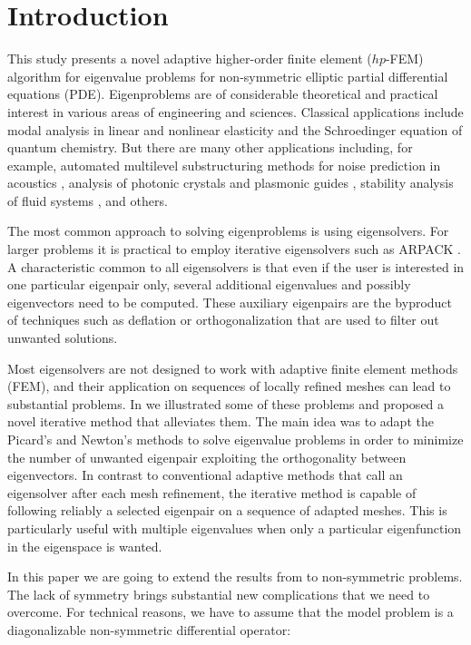 \documentclass[smallextended]{svjour3}
\begin{document}
\section{Introduction}\label{sec:intro}
\setcounter{equation}{0}

This study presents a novel adaptive higher-order finite element ($hp$-FEM) 
algorithm for eigenvalue problems for non-symmetric elliptic 
partial differential equations (PDE). Eigenproblems are of considerable 
theoretical and practical interest in various areas of engineering and 
sciences. Classical applications include modal analysis in linear and nonlinear
elasticity and the Schroedinger equation of quantum chemistry. But there
are many other applications including, for example, automated multilevel substructuring 
methods for noise prediction in acoustics \cite{lalor_prediction_2007},
analysis of photonic crystals \cite{pcf_apost,JoMeWi:95} and 
plasmonic guides \cite{berini_plasmon-polariton_2000},
stability analysis of fluid systems \cite{cliffe_adaptive_2010}, and others.

The most common approach to solving eigenproblems is using eigensolvers. For larger problems it is 
practical to employ iterative eigensolvers such as ARPACK \cite{arpack}. A characteristic common to 
all eigensolvers is that even if the user is interested in one particular eigenpair only, several 
additional eigenvalues and possibly eigenvectors need to be computed. These auxiliary eigenpairs are 
the byproduct of techniques such as deflation or orthogonalization that are used to filter out 
unwanted solutions.

Most eigensolvers are not designed to work with adaptive finite element methods (FEM), and 
their application on sequences of locally refined meshes can lead to substantial problems. 
In \cite{solin-giani} we illustrated some of these problems and proposed a novel iterative 
method that alleviates them. The main idea was to adapt the Picard's and Newton's methods 
to solve eigenvalue problems in order to minimize the number of unwanted eigenpair exploiting 
the orthogonality between eigenvectors. In contrast to conventional adaptive methods that 
call an eigensolver after each mesh refinement, the iterative method is capable of following 
reliably a selected eigenpair on a sequence of adapted meshes. This is particularly useful 
with multiple eigenvalues when only a particular eigenfunction in the eigenspace is wanted. 

In this paper we are going to extend the results from \cite{solin-giani} to non-symmetric problems.
The lack of symmetry brings substantial new complications that we need to overcome. For 
technical reasons, we have to assume that the model problem is a diagonalizable non-symmetric 
differential operator:
\end{document}
